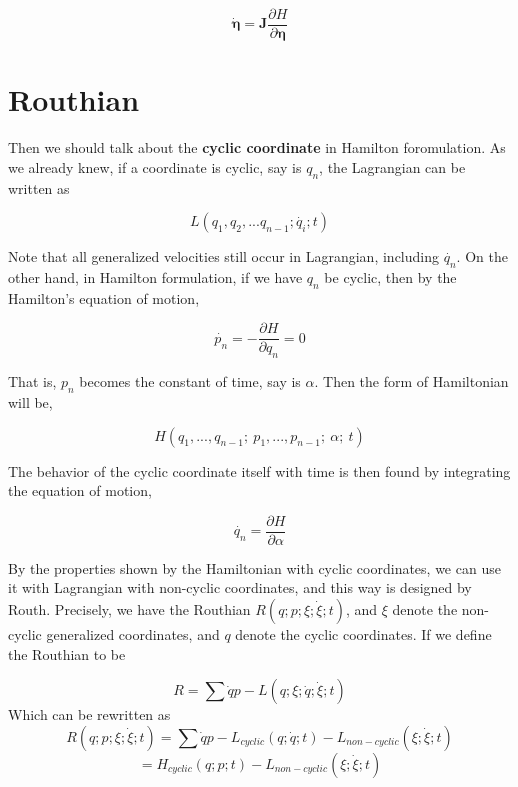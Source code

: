 \documentclass[12pt]{article}
\numberwithin{equation}{section}
\begin{document}
\begin{center}
    \[ \dot{\pmb{\eta}} = \pmb{J}\frac{\partial H}{\partial \pmb{\eta}} \]
\end{center}

\section{Routhian}

Then we should talk about the \textbf{cyclic coordinate} in Hamilton foromulation. As we already knew, if a coordinate is cyclic, say is $q_n$, the Lagrangian can be written as 

\begin{center}
    \[ L(q_1, q_2, ... q_{n-1}; \dot{q_i}; t) \]
\end{center}

Note that all generalized velocities still occur in Lagrangian, including $\dot{q_n}$. On the other hand, in Hamilton formulation, if we have $q_n$ be cyclic, then by the Hamilton's equation of motion,

\begin{center}
    \[ \dot{p_n} = - \frac{\partial H}{\partial q_n}  = 0 \]
\end{center}

That is, $p_n$ becomes the constant of time, say is $\alpha$. Then the form of Hamiltonian will be,

\begin{center}
    \[ H(q_1, ..., q_{n-1};\ p_1, ..., p_{n-1};\ \alpha;\ t) \]
\end{center}

The behavior of the cyclic coordinate itself with time is then found by integrating the equation of motion,

\begin{center}
    \[ \dot{q_n} = \frac{\partial H}{\partial \alpha} \]
\end{center}

By the properties shown by the Hamiltonian with cyclic coordinates, we can use it with Lagrangian with non-cyclic coordinates, and this way is designed by Routh. Precisely, we have the Routhian $R(q; p; \xi; \dot{\xi}; t)$, and $\xi$ denote the non-cyclic generalized coordinates, and $q$ denote the cyclic coordinates.
If we define the Routhian to be

\begin{center}
    \[ R = \sum{\dot{q}p} - L(q; \xi; \dot{q}; \dot{\xi}; t) \]
    Which can be rewritten as 
    \[ R(q;p;\xi;\dot{\xi};t) = \sum{\dot{q}p} - L_{cyclic}(q;\dot{q};t) - L_{non-cyclic}(\xi;\dot{\xi};t) \]
    \[ = H_{cyclic}(q;p;t) - L_{non-cyclic}(\xi;\dot{\xi};t) \]
\end{center}
\end{document}
